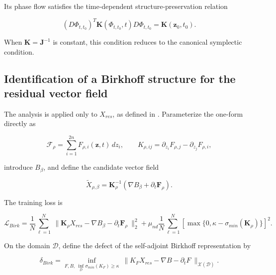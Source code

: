 Its phase flow satisfies the time-dependent structure-preservation relation

\begin{equation}
\label{eq:symplectic-kam-5-9}
\left( D\Phi_{t,t_{0}} \right)^{T}\mathbf{K}\left( \Phi_{t,t_{0}},t \right)D\Phi_{t,t_{0}} = \mathbf{K}\left( \mathbf{z}_{0},t_{0} \right).
\end{equation}

When \(\mathbf{K} = \mathbf{J}^{- 1}\) is constant, this condition reduces to the canonical symplectic condition.

\subsection{Identification of a Birkhoff structure for the residual vector field}\label{sec:symplectic-kam-5-4}

The analysis is applied only to \(X_{res}\), as defined in . Parameterize the one-form directly as

\begin{equation}
\label{eq:symplectic-kam-5-10}
\mathcal{F}_{\rho} = \sum_{i = 1}^{2n}F_{\rho,i}\left( \mathbf{z},t \right)\, dz_{i},\quad\quad K_{\rho,ij} = \partial_{z_{i}}F_{\rho,j} - \partial_{z_{j}}F_{\rho,i},
\end{equation}

introduce \(B_{\beta}\), and define the candidate vector field

\begin{equation}
\label{eq:symplectic-kam-5-11}
{\widetilde{X}}_{\rho,\beta} = \mathbf{K}_{\rho}^{- 1}\left( \nabla B_{\beta} + \partial_{t}\mathbf{F}_{\rho} \right).
\end{equation}

The training loss is

\begin{equation}
\label{eq:symplectic-kam-5-12}
\mathcal{L}_{Birk} = \frac{1}{N}\sum_{\ell = 1}^{N}\left. \  \parallel \mathbf{K}_{\rho}X_{res} - \nabla B_{\beta} - \partial_{t}\mathbf{F}_{\rho} \right.\  \parallel_{2}^{2} + \mu_{nd}\frac{1}{N}\sum_{\ell = 1}^{N}\left\lbrack \max\{ 0,\kappa - \sigma_{min}\left( \mathbf{K}_{\rho} \right)\} \right\rbrack^{2}.
\end{equation}

On the domain \(\mathcal{D}\), define the defect of the self-adjoint Birkhoff representation by

\begin{equation}
\label{eq:symplectic-kam-5-13}
\boxed{\delta_{Birk} = \inf_{F,B,\ \inf_{\mathcal{D}}\sigma_{min}\left( K_{F} \right) \geq \kappa}\left. \  \parallel K_{F}X_{res} - \nabla B - \partial_{t}F \right.\  \parallel_{\mathcal{X}\left( \mathcal{D} \right)}.}
\end{equation}

